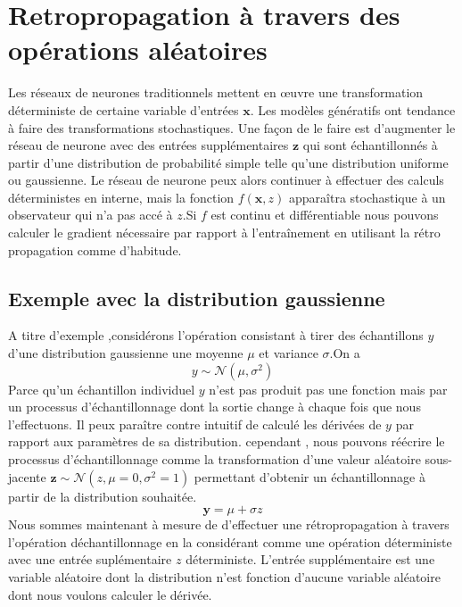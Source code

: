 \documentclass[12pt,a4paper]{report}
\begin{document}
\section{Retropropagation à travers des opérations aléatoires}
Les réseaux de neurones traditionnels mettent en œuvre une transformation déterministe de certaine  variable d'entrées $\textbf{x}$.
Les modèles génératifs ont tendance à faire des transformations stochastiques. Une façon de le faire est d’augmenter le  réseau de neurone avec des entrées supplémentaires $\textbf{z}$ qui sont échantillonnés à partir d'une distribution de probabilité simple telle qu'une distribution uniforme ou gaussienne. Le réseau de neurone peux alors continuer à effectuer des calculs  déterministes en interne, mais la fonction $f(\textbf{x},z)$ apparaîtra stochastique à un observateur qui n'a pas accé  à $z$.Si $f$ est continu et différentiable nous pouvons calculer le gradient nécessaire par rapport à l’entraînement en utilisant la rétro propagation comme d'habitude.

\subsection{Exemple avec la distribution gaussienne}
A titre d'exemple ,considérons l'opération  consistant à tirer des échantillons $y$ d'une distribution gaussienne une moyenne $\mu$   et variance $\sigma$.On a 
\begin{equation}
y \sim  \mathcal{N}(\mu,\sigma^{2})
\end{equation}
Parce qu'un échantillon individuel $y$ n'est pas produit pas une fonction mais par un processus d’échantillonnage dont la sortie change à chaque fois que nous l'effectuons. Il peux paraître contre intuitif de calculé les dérivées de $y$ par rapport aux paramètres de sa distribution. cependant , nous pouvons réécrire le processus d’échantillonnage comme la transformation d'une valeur aléatoire sous-jacente $\textbf{z} \sim  \mathcal{N}(z,\mu=0,\sigma^{2}=1)$ permettant d'obtenir un échantillonnage à partir de la distribution souhaitée.\\
\begin{equation}
\textbf{y}=\mu+\sigma z
\end{equation}
Nous sommes maintenant à mesure de d'effectuer une rétropropagation à travers l'opération déchantillonnage en la considérant comme une  opération déterministe avec une entrée suplémentaire $z$ déterministe. L'entrée supplémentaire est une variable aléatoire dont la distribution n'est fonction d'aucune variable aléatoire dont nous voulons calculer le dérivée. 
\end{document}
